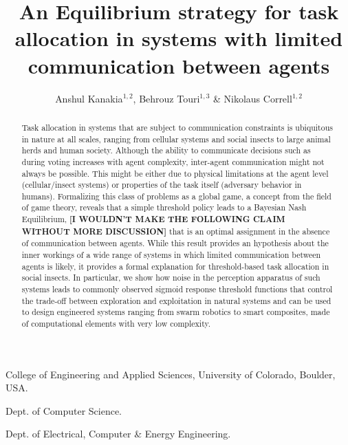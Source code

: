 \documentclass{nature}
\title{An Equilibrium strategy for task allocation in systems with limited communication between agents}
\author{Anshul Kanakia$^{1,2}$, Behrouz Touri$^{1,3}$ \& Nikolaus Correll$^{1,2}$}
\begin{document}
\maketitle
\begin{affiliations}
 \item College of Engineering and Applied Sciences, University of Colorado, Boulder, USA. 
 \item Dept. of Computer Science.
 \item Dept. of Electrical, Computer \& Energy Engineering.
\end{affiliations}

\linenumbers
\begin{abstract}
Task allocation in systems that are subject to communication constraints is ubiquitous in nature at all scales, ranging from cellular systems\cite{Yoshida2010, Suzuki2015} and social insects\cite{Robinson1987, Gordon1996, Bonabeau1998, Theraulaz1998} to large animal herds\cite{Conradt2003, Conradt2005} and human society\cite{Raafat2009}. Although the ability to communicate decisions such as during voting\cite{Conradt2003} increases with agent complexity, inter-agent communication might not always be possible. This might be either due to physical limitations at the agent level (cellular/insect systems) or properties of the task itself (adversary behavior in humans). Formalizing this class of problems as a global game, a concept from the field of game theory, reveals that a simple threshold policy leads to a Bayesian Nash Equilibrium, \textbf{[I WOULDN'T MAKE THE FOLLOWING CLAIM WITHOUT MORE DISCUSSION]} that is an optimal assignment in the absence of communication between agents. While this result provides an hypothesis about the inner workings of a wide range of systems in which limited communication between agents is likely, it provides a formal explanation for threshold-based task allocation in social insects. In particular, we show how noise in the perception apparatus of such systems leads to commonly observed sigmoid response threshold functions that control the trade-off between exploration and exploitation\cite{Bonabeau1997} in natural systems and can be used to design engineered systems ranging from swarm robotics\cite{Martinoli1999, Krieger2000, Kube2000, Mataric2003, Gerkey2004} to smart composites\cite{McEvoy2015}, made of computational elements with very low complexity. 
\end{abstract}
\end{document}
